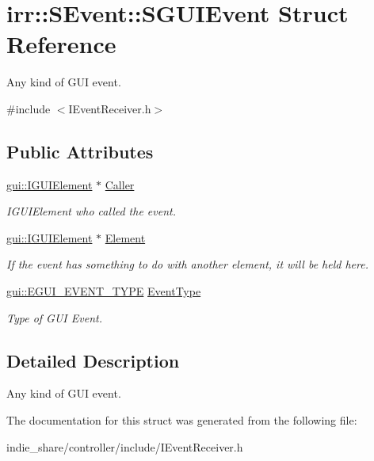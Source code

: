 \hypertarget{structirr_1_1SEvent_1_1SGUIEvent}{}\section{irr\+:\+:S\+Event\+:\+:S\+G\+U\+I\+Event Struct Reference}
\label{structirr_1_1SEvent_1_1SGUIEvent}


Any kind of G\+UI event.  




{\ttfamily \#include $<$I\+Event\+Receiver.\+h$>$}

\subsection*{Public Attributes}
\begin{DoxyCompactItemize}
\item 
\mbox{\label{structirr_1_1SEvent_1_1SGUIEvent_ac1d2f9877279789eff70977185729e64}} 
\hyperlink{classirr_1_1gui_1_1IGUIElement}{gui\+::\+I\+G\+U\+I\+Element} $\ast$ \hyperlink{structirr_1_1SEvent_1_1SGUIEvent_ac1d2f9877279789eff70977185729e64}{Caller}
\begin{DoxyCompactList}\small\item\em I\+G\+U\+I\+Element who called the event. \end{DoxyCompactList}\item 
\mbox{\label{structirr_1_1SEvent_1_1SGUIEvent_a6f03d52d71c814e644284a024986de5b}} 
\hyperlink{classirr_1_1gui_1_1IGUIElement}{gui\+::\+I\+G\+U\+I\+Element} $\ast$ \hyperlink{structirr_1_1SEvent_1_1SGUIEvent_a6f03d52d71c814e644284a024986de5b}{Element}
\begin{DoxyCompactList}\small\item\em If the event has something to do with another element, it will be held here. \end{DoxyCompactList}\item 
\mbox{\label{structirr_1_1SEvent_1_1SGUIEvent_a96745fdb14db858583f9bb7abfd6bfbc}} 
\hyperlink{namespaceirr_1_1gui_aeac71ad17341a4b6e9026ae11d576808}{gui\+::\+E\+G\+U\+I\+\_\+\+E\+V\+E\+N\+T\+\_\+\+T\+Y\+PE} \hyperlink{structirr_1_1SEvent_1_1SGUIEvent_a96745fdb14db858583f9bb7abfd6bfbc}{Event\+Type}
\begin{DoxyCompactList}\small\item\em Type of G\+UI Event. \end{DoxyCompactList}\end{DoxyCompactItemize}


\subsection{Detailed Description}
Any kind of G\+UI event. 

The documentation for this struct was generated from the following file\+:\begin{DoxyCompactItemize}
\item 
indie\+\_\+share/controller/include/I\+Event\+Receiver.\+h\end{DoxyCompactItemize}
